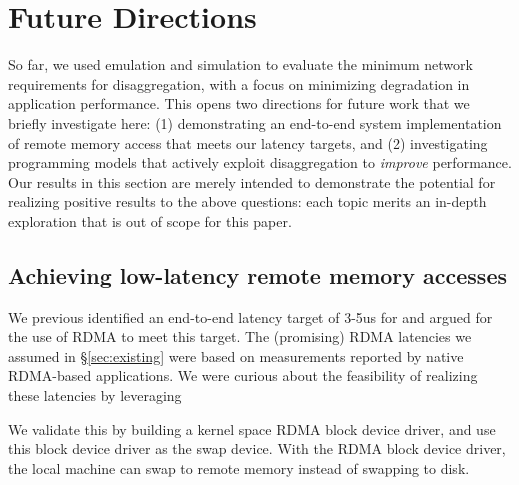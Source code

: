 \vspace{-0.1in}
\section{Future Directions}
\label{sec:future}
\vspace{-0.05in}

So far, we used emulation and simulation to evaluate the minimum network requirements for disaggregation, with a focus on minimizing degradation in application performance. 
This opens two directions for future work that we briefly investigate here: (1) demonstrating an end-to-end system implementation of remote memory access that meets our latency targets, and (2) investigating programming models that actively exploit disaggregation to \emph{improve} performance.
Our results in this section are merely intended to demonstrate the potential for realizing positive results to the above questions: each topic merits an in-depth exploration that is out of scope for this paper.


\vspace{-0.1in}
\subsection{Achieving low-latency remote memory accesses}
\vspace{-0.05in}
We previous identified an end-to-end latency target of 3-5us for \dis and argued for the use of  RDMA to meet this target. The (promising) RDMA latencies we assumed in \S\ref{sec:existing} were based 
on measurements reported by native RDMA-based applications. 
We were curious about the feasibility of realizing these latencies by leveraging 



We validate this by building a kernel space RDMA block device driver, and use this block device driver as the swap device.
With the RDMA block device driver, the local machine can swap to remote memory instead of swapping to disk.


